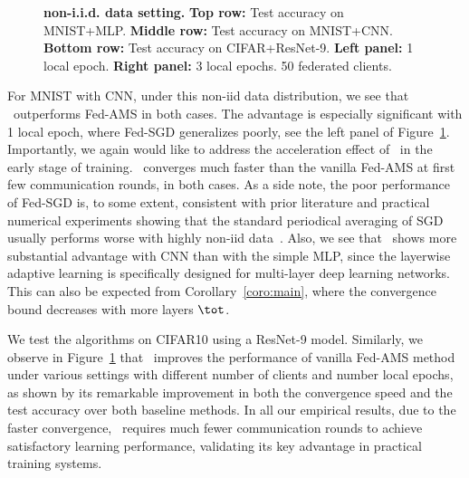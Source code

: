 \documentclass[twoside]{article}
\begin{document}
\begin{figure}[t!]
\begin{center}
{        }
    \end{center}
    \vspace{0.05in}
	\caption{\textbf{non-i.i.d. data setting.} \textbf{Top row:} Test accuracy on MNIST+MLP. 
	\textbf{Middle row:} Test accuracy on MNIST+CNN. 
	\textbf{Bottom row:} Test accuracy on CIFAR+ResNet-9.
	\textbf{Left panel:} 1 local epoch. \textbf{Right panel:} 3 local epochs. 50 federated clients.}
	\label{fig:noniid}
	\vspace{-0.1in}
\end{figure}


For MNIST with CNN, under this non-iid data distribution, we see that \algo\ outperforms Fed-AMS in both cases. The advantage is especially significant with 1 local epoch, where Fed-SGD generalizes poorly, see the left panel of Figure~\ref{fig:noniid}. 
Importantly, we again would like to address the acceleration effect of \algo\, in the early stage of training. \algo\ converges much faster than the vanilla Fed-AMS at first few communication rounds, in both cases. 
As a side note, the poor performance of Fed-SGD is, to some extent, consistent with prior literature and practical numerical experiments showing that the standard periodical averaging of SGD usually performs worse with highly non-iid data~\cite{chen2020toward,reddi2020adaptive}. Also, we see that \algo\ shows more substantial advantage with CNN than with the simple MLP, since the layerwise adaptive learning is specifically designed for multi-layer deep learning networks. This can also be expected from Corollary~\ref{coro:main}, where the convergence bound decreases with more layers $\tot$.


We test the algorithms on CIFAR10 using a ResNet-9 model. 
Similarly, we observe in Figure~\ref{fig:noniid} that \algo\ improves the performance of vanilla Fed-AMS method under various settings with different number of clients and number local epochs, as shown by its remarkable improvement in both the convergence speed and the test accuracy over both baseline methods. In all our empirical results, due to the faster convergence, \algo\ requires much fewer communication rounds to achieve satisfactory learning performance, validating its key advantage in practical training systems.


\begin{table}[H]
\small
\caption{ Test Accuracies for larger models.}\label{tab:acc}
\end{table}
\end{document}
